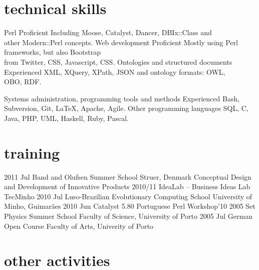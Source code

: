 \documentclass[a4paper]{friggeri-cv}
\begin{document}
\section{technical skills}
\begin{entrylist}
	\entry
		{}
		{Perl}
		{Proficient}
		{Including Moose, Catalyst, Dancer, DBIx::Class and\\
		other Modern::Perl concepts.}
	\entry
		{}
		{Web development}
		{Proficient}
		{Mostly using Perl frameworks, but also Bootstrap\\
		from Twitter, CSS, Javascript, CSS.}
	\entry
		{}
		{Ontologies and structured documents}
		{Experienced}
		{XML, XQuery, XPath, JSON and ontology formats: OWL,\\
		OBO, RDF.}
\end{entrylist}
\begin{entrylist}
	\entry
		{}
		{Systems administration, programming tools and methods}
		{Experienced}
		{Bash, Subversion, Git, \LaTeX, Apache, Agile.}
	\entry
		{}
		{Other programming languages}
		{}
		{SQL, C, Java, PHP, UML, Haskell, Ruby, Pascal.}
\end{entrylist}

\section{training}
\begin{entrylist}
	\entry
		{2011 {\footnotesize Jul}}
		{Band and Olufsen Summer School}
		{Struer, Denmark}
		{Conceptual Design and Development of Innovative Products}
	\entry
		{2010/11}
		{IdeaLab -- Business Ideas Lab}
		{TecMinho}
		{\vspace{-0.8cm}}
	\entry
		{2010 {\footnotesize Jul}}
		{Luso-Brazilian Evolutionary Computing School}
		{University of Minho, Guimarães}
		{\vspace{-0.8cm}}
	\entry
		{2010 {\footnotesize Jun}}
		{Catalyst 5.80}
		{Portuguese Perl Workshop'10}
		{\vspace{-0.8cm}}
	\entry
		{2005 {\footnotesize Set}}
		{Physics Summer School}
		{Faculty of Science, University of Porto}
		{\vspace{-0.8cm}}
	\entry
		{2005 {\footnotesize Jul}}
		{German Open Course}
		{Faculty of Arts, Univerity of Porto}
		{\vspace{-0.8cm}}
\end{entrylist}


\section{other activities}
\end{document}
